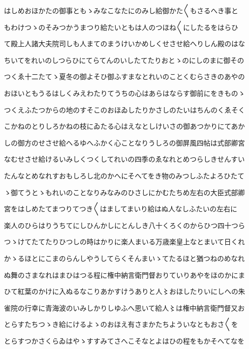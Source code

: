 \documentclass[a4paper,11pt,landscape]{ltjtarticle}
\begin{document}
\par\medskip
はしめおほかたの御事ともゝみなこなたにのみし給御かた〱もさるへき事と
\par\medskip
もわけつゝのそみつかうまつり給たいともは人のつほね〱にしたるをはらひ
\par\medskip
て殿上人諸大夫院司しも人まてのまうけいかめしくせさせ給へりしん殿のはな
\par\medskip
ちいてをれいのしつらひにてらてんのいしたてたりおとゝのにしのまに御その
\par\medskip
つくゑ十二たてゝ夏冬の御よそひ御ふすまなとれいのことくむらさきのあやの
\par\medskip
おほいともうるはしくみえわたりてうちの心はあらはならす御前にをきものゝ
\par\medskip
つくえふたつからの地のすそこのおほゐしたりかさしのたいはちんのくゑそく
\par\medskip
こかねのとりしろかねの枝にゐたる心はえなとしけいさの御あつかりにてあか
\par\medskip
しの御方のせさせ給へるゆへふかく心ことなりうしろの御屏風四帖は式部卿宮
\par\medskip
なむせさせ給けるいみしくつくしてれいの四季のゑなれとめつらしきせんすい
\par\medskip
たんなとめなれすおもしろし北のかへにそへてをき物のみつしふたよろひたて
\par\medskip
ゝ御てうとゝもれいのことなりみなみのひさしにかむたちめ左右の大臣式部卿
\par\medskip
宮をはしめたてまつりてつき〱はましてまいり給はぬ人なしふたいの左右に
\par\medskip
楽人のひらはりうちてにしひんかしにとんしき八十くろくのからひつ四十つら
\par\medskip
つゝけてたてたりひつしの時はかりに楽人まいる万歳楽皇上なとまいて日くれ
\par\medskip
かゝるほとにこまのらんしやうしてらくそんまいゝてたるほと猶つねのめなれ
\par\medskip
ぬ舞のさまなれはまひはつる程に権中納言衛門督おりていりあやをほのかにま
\par\medskip
ひて紅葉のかけに入ぬるなこりあかすけうありと人〻おほしたりいにしへの朱
\par\medskip
雀院の行幸に青海波のいみしかりしゆふへ思いて給人〻は権中納言衛門督又お
\par\medskip
とらすたちつゝき給にけるよゝのおほえ有さまかたちよういなともおさ〱を
\par\medskip
とらすつかさくらゐはやゝすすみてさへこそなとよはひの程をもかそへてなを
\par\medskip
\end{document}
